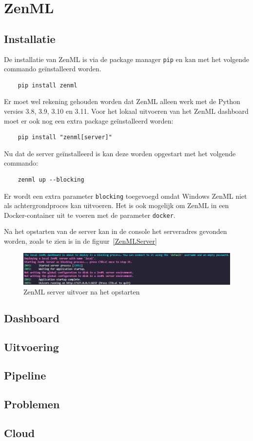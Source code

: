 \section{ZenML}
\subsection{Installatie}
De installatie van ZenML is via de package manager \texttt{pip} en kan met het volgende commando geïnstalleerd worden.
\begin{verbatim}
    pip install zenml
\end{verbatim}
Er moet wel rekening gehouden worden dat ZenML alleen werk met de Python versies 3.8, 3.9, 3.10 en 3.11.
Voor het lokaal uitvoeren van het ZenML dashboard moet er ook nog een extra package geïnstalleerd worden:
\begin{verbatim}
    pip install "zenml[server]"
\end{verbatim}

Nu dat de server geïnstalleerd is kan deze worden opgestart met het volgende commando: 
\begin{verbatim}
    zenml up --blocking
\end{verbatim}
Er wordt een extra parameter \texttt{blocking} toegevoegd omdat Windows ZenML niet als achtergrondproces kan uitvoeren. Het is ook mogelijk om ZenML in een Docker-container uit te voeren met de parameter \texttt{docker}.

Na het opstarten van de server kan in de console het serveradres gevonden worden, zoals te zien is in de figuur~\ref{ZenMLServer}
\begin{figure}
    \centering
    \includegraphics[width=0.9\linewidth]{graphics/ZenML_Server.PNG}
    \caption{ZenML server uitvoer na het opstarten}
    \label{fig:ZenMLServer}
\end{figure}
\subsection{Dashboard}

\subsection{Uitvoering}
\subsection{Pipeline}
\subsection{Problemen}
\subsection{Cloud}
